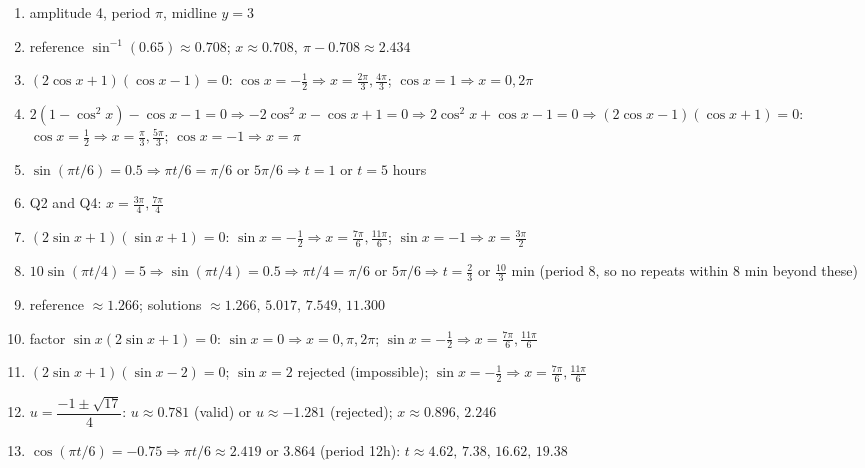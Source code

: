 \documentclass[11pt]{article}
\begin{document}
\begin{keybox}
\begin{multicols}{2}
\small
\begin{enumerate}[leftmargin=*,itemsep=3pt]
  \item amplitude 4, period $\pi$, midline $y=3$
  \item reference $\sin^{-1}(0.65)\approx0.708$; $x\approx0.708,\ \pi-0.708\approx2.434$
  \item $(2\cos x+1)(\cos x-1)=0$: $\cos x=-\tfrac12\Rightarrow x=\tfrac{2\pi}3,\tfrac{4\pi}3$; $\cos x=1\Rightarrow x=0,2\pi$
  \item $2(1-\cos^2x)-\cos x-1=0\Rightarrow-2\cos^2x-\cos x+1=0\Rightarrow2\cos^2x+\cos x-1=0\Rightarrow(2\cos x-1)(\cos x+1)=0$: $\cos x=\tfrac12\Rightarrow x=\tfrac{\pi}3,\tfrac{5\pi}3$; $\cos x=-1\Rightarrow x=\pi$
  \item $\sin(\pi t/6)=0.5\Rightarrow \pi t/6=\pi/6$ or $5\pi/6\Rightarrow t=1$ or $t=5$ hours
  \item Q2 and Q4: $x=\tfrac{3\pi}4,\tfrac{7\pi}4$
  \item $(2\sin x+1)(\sin x+1)=0$: $\sin x=-\tfrac12\Rightarrow x=\tfrac{7\pi}6,\tfrac{11\pi}6$; $\sin x=-1\Rightarrow x=\tfrac{3\pi}2$
  \item $10\sin(\pi t/4)=5\Rightarrow\sin(\pi t/4)=0.5\Rightarrow\pi t/4=\pi/6$ or $5\pi/6\Rightarrow t=\tfrac23$ or $\tfrac{10}3$ min (period 8, so no repeats within 8 min beyond these)
  \item reference $\approx1.266$; solutions $\approx1.266,\,5.017,\,7.549,\,11.300$
  \item factor $\sin x(2\sin x+1)=0$: $\sin x=0\Rightarrow x=0,\pi,2\pi$; $\sin x=-\tfrac12\Rightarrow x=\tfrac{7\pi}6,\tfrac{11\pi}6$
  \item $(2\sin x+1)(\sin x-2)=0$; $\sin x=2$ rejected (impossible); $\sin x=-\tfrac12\Rightarrow x=\tfrac{7\pi}6,\tfrac{11\pi}6$
  \item $u=\dfrac{-1\pm\sqrt{17}}4$: $u\approx0.781$ (valid) or $u\approx-1.281$ (rejected); $x\approx0.896,\,2.246$
  \item $\cos(\pi t/6)=-0.75\Rightarrow \pi t/6\approx2.419$ or $3.864$ (period 12h): $t\approx4.62,\,7.38,\,16.62,\,19.38$
\end{enumerate}
\end{multicols}
\end{keybox}
\end{document}
